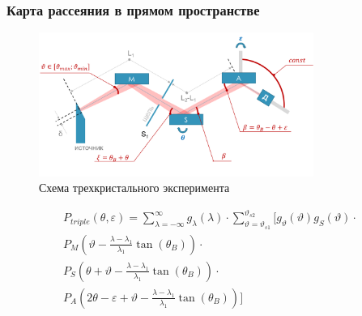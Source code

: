 
\subsubsection{Карта рассеяния в прямом пространстве}

\begin{figure}[H]
  \centering
  \includegraphics[width=0.8\textwidth]{images/triple_crystal_schem.png}
  \caption{Схема трехкристального эксперимента}
  \label{ris:}
\end{figure}

\begin{eqnarray} \label{eq:doudle_spectra_angle_map}
  P_{triple}(\theta,\varepsilon) = \sum_{\lambda = -\infty}^{\infty}g_{\lambda}(\lambda)\cdot
  \sum_{\vartheta = \vartheta_{s1}}^{\vartheta_{s2}} \Bigg[ g_{\vartheta}(\vartheta) g_{S}(\vartheta) \cdot \nonumber \\
    P_M \left(\vartheta - \frac{\lambda - \lambda_1}{\lambda_1}\tan(\theta_B) \right) \cdot \nonumber \\
   P_S \left(\theta + \vartheta - \frac{\lambda - \lambda_1}{\lambda_1}\tan(\theta_B)\right)  \cdot  \nonumber \\
   P_A \left(2\theta - \varepsilon + \vartheta - \frac{\lambda - \lambda_1}{\lambda_1}\tan(\theta_B)\right) \Bigg]
 \end{eqnarray}
